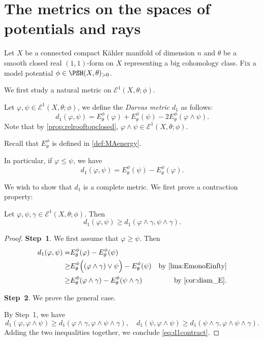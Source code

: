 \section{The metrics on the spaces of potentials and rays}\label{sec:metE1}

Let $X$ be a connected compact Kähler manifold of dimension $n$ and $\theta$ be a smooth closed real $(1,1)$-form on $X$ representing a big cohomology class.
Fix a model potential $\phi\in \PSH(X,\theta)_{>0}$.

We first study a natural metric on $\mathcal{E}^1(X,\theta;\phi)$.

\begin{definition}\label{def:d1onE12}
    Let $\varphi,\psi\in \mathcal{E}^1(X,\theta;\phi)$, we define the \emph{Darvas metric} $d_1$ as follows:
    \[
        d_1(\varphi,\psi)=E_{\theta}^{\phi}(\varphi)+E_{\theta}^{\phi}(\psi)-2E_{\theta}^{\phi}(\varphi\land \psi).
    \]
    Note that by \cref{prop:relrooftopclosed}, $\varphi\land \psi\in \mathcal{E}^1(X,\theta;\phi)$.
\end{definition}
Recall that $E_{\theta}^{\phi}$ is defined in \cref{def:MAenergy}.

In particular, if $\varphi\leq \psi$, we have
\begin{equation}\label{eq:d1asEdiff}
    d_1(\varphi,\psi)=E_{\theta}^{\phi}(\psi)-E_{\theta}^{\phi}(\varphi).
\end{equation}

We wish to show that $d_1$ is a complete metric. We first prove a contraction property:
\begin{proposition}\label{prop:d1contract}
    Let $\varphi,\psi,\gamma\in \mathcal{E}^1(X,\theta;\phi)$. Then
    \begin{equation}\label{eq:d1contract}
    d_1(\varphi,\psi)\geq d_1(\varphi\land \gamma,\psi\land \gamma).
    \end{equation}
\end{proposition}
\begin{proof}
    \textbf{Step~1}. We first assume that $\varphi\geq \psi$. Then
    \[
    \begin{aligned}
        d_1(\varphi,\psi)=& E_{\theta}^{\phi}(\varphi)-E_{\theta}^{\phi}(\psi)\\
        \geq & E_{\theta}^{\phi}\Bigl((\varphi\land \gamma)\lor \psi\Bigr)-E_{\theta}^{\phi}(\psi) & \textup{by \cref{lma:EmonoEinfty}}\\
        \geq & E_{\theta}^{\phi}(\varphi\land \gamma)-E_{\theta}^{\phi}(\psi\land \gamma)&\textup{by \cref{cor:diam_E}}.
    \end{aligned}
    \]

    \textbf{Step~2}. We prove the general case.

    By Step~1, we have
    \[
    d_1(\varphi,\varphi\land \psi)\geq d_1(\varphi\land \gamma,\varphi\land \psi\land \gamma),\quad d_1(\psi,\varphi\land \psi)\geq d_1(\psi\land \gamma,\varphi\land \psi\land \gamma).
    \]
    Adding the two inequalities together, we conclude \eqref{eq:d1contract}.
\end{proof}


